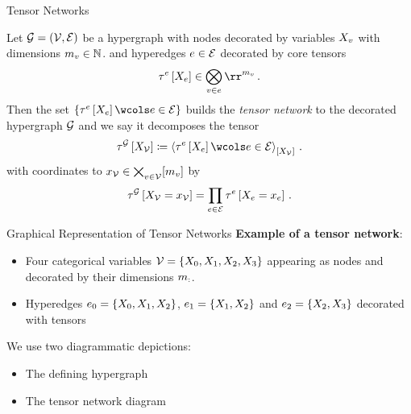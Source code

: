 \documentclass{beamer}
\begin{document}
    \begin{frame}{Tensor Networks}
        \begin{definition}
            Let $\mathcal{G}=(\mathcal{V},\mathcal{E})$ be a hypergraph with nodes decorated by variables $X_{v}$ with dimensions $m_{v} \in \mathbb{N}$.
            and hyperedges $e\in\mathcal{E}$ decorated by core tensors
            \[ \hypercoreofat{\edge}{\catvariableof{\edge}} \in \bigotimes_{\node\in\edge}\rr^{\catdimof{\node}} \, . \]
            Then the set $\{\hypercoreofat{\edge}{\catvariableof{\edge}}\wcols\edgein\}$ builds the \emph{tensor network} to the decorated hypergraph $\mathcal{G}$ and we say it decomposes the tensor
            \[ \tnetofat{\graph}{\nodevariables} \coloneqq
            \contractionof{\hypercoreofat{\edge}{\catvariableof{\edge}} \wcols \edge\in\edges}{\nodevariables} \, .
            \]
            with coordinates to $x_{\mathcal{V}}\in\bigtimes_{v\in\mathcal{V}}[m_{v}]$ by
            \begin{align*}
                \tau^{\mathcal{G}}\left[X_{\mathcal{V}}=x_{\mathcal{V}}\right]
                = \prod_{e\in\mathcal{E}} \tau^{e}\left[X_{e}=x_{e}\right] \, .
            \end{align*}
        \end{definition}
    \end{frame}

    \begin{frame}{Graphical Representation of Tensor Networks}
        \textbf{Example of a tensor network}:
        \begin{itemize}
            \item Four categorical variables $\mathcal{V} = \{X_{0},X_{1},X_{2},X_{3}\}$ appearing as nodes and decorated by their dimensions $m_{:}$.
            \item Hyperedges  $e_0=\{X_{0},X_{1},X_{2}\}$, $e_1=\{X_{1},X_{2}\}$ and $e_2=\{X_{2},X_{3}\}$ decorated with tensors
        \end{itemize}
        \begin{center}
            
        \end{center}
        We use two diagrammatic depictions:
        \begin{itemize}
            \item[a)] The defining hypergraph
            \item[b)] The tensor network diagram
        \end{itemize}
    \end{frame}
\end{document}
